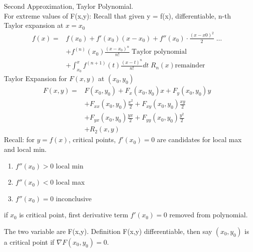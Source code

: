 \documentclass{article}
\begin{document}
        Second Approximation, Taylor Polynomial.\\
        
        For extreme values of F(x,y): Recall that given y = f(x), differentiable, n-th Taylor expansion at $x = x_0$
        \begin{align}
            f(x) =& f(x_0) + f'(x_0)(x-x_0) + f''(x_0)\cdot\frac{(x-x0)^2}{2}\;\dots\\
            &+ f^{(n)}(x_0)\frac{(x-x_0)^n}{n!}\;\text{Taylor polynomial}\\
            &+ \int^{x}_{x_0}f^(n+1)(t)\frac{(x-t)^n}{n!}dt\;R_n(x)\text{remainder}
        \end{align}
        Taylor Expansion for $F(x,y)$ at $(x_0,y_0)$
        \begin{align}
            F(x,y) =& F(x_0,y_0) + F_x(x_0,y_0)x + F_y(x_0,y_0)y\\
            &+ F_{xx}(x_0,y_0)\frac{x^2}{2} + F_{xy}(x_0,y_0)\frac{xy}{2}\\
            &+ F_{yx}(x_0,y_0)\frac{yx}{2} + F_{yy}(x_0,y_0)\frac{y^2}{2}\\
            &+ R_2(x,y)
        \end{align}
        Recall: for $y=f(x)$, critical points, $f'(x_0) = 0$ are candidates for local max and local min.
        \begin{enumerate}
            \item $f''(x_0) > 0$ local min
            \item $f''(x_0) < 0$ local max
            \item $f''(x_0) = 0$ inconclusive
        \end{enumerate}
        if $x_0$ is critical point, first derivative term $f'(x_0) = 0$ removed from polynomial. 
        
        The two variable are F(x,y). Definition F(x,y) differentiable, then say $(x_0,y_0)$ is a critical point if $\nabla F(x_0,y_0) = 0$.
        
\end{document}
